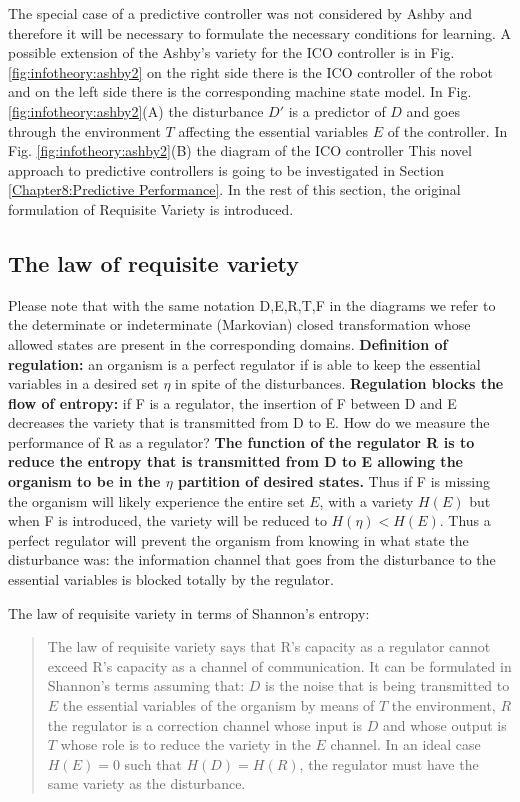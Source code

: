 The special case of a predictive controller was not considered by Ashby and therefore
it will be necessary to formulate the necessary conditions for learning.
A possible extension of the Ashby's variety for the ICO controller is in Fig. \ref{fig:infotheory:ashby2}
on the right side there is the ICO controller of the robot and on the left side
there is the corresponding machine state model.
In Fig. \ref{fig:infotheory:ashby2}(A) the disturbance $D'$ is a predictor of $D$ and goes
through the environment $T$ affecting the essential variables $E$ of the controller.
In Fig. \ref{fig:infotheory:ashby2}(B) the diagram of the ICO controller 
This novel approach to predictive controllers is going to be investigated in Section \ref{Chapter8:Predictive Performance}.
In the rest of this section, the original formulation of Requisite Variety is 
introduced.

\subsection{The law of requisite variety}
Please note that with the same notation D,E,R,T,F in the diagrams we refer to
 the determinate or indeterminate (Markovian) closed transformation whose
allowed states are present in the corresponding domains.
\textbf{Definition of regulation:} an organism is a perfect regulator if
is able to keep the essential variables in a desired set $\eta$ in spite
of the disturbances.
\textbf{Regulation blocks the flow of entropy: } if F is a regulator, the insertion
of F between D and E decreases the variety that is transmitted from D to E.
How do we measure the performance of R as a regulator?
\textbf{The function of the regulator R is to reduce the entropy that is transmitted
 from D to E allowing the organism to be in the $\eta$ partition of desired states.}
Thus if F is missing the organism will likely experience the entire set $E$, with
a variety $H(E)$ but when F is introduced, the variety will be reduced to $H(\eta)<H(E)$.
Thus a perfect regulator will prevent the organism from knowing in what state the
disturbance was: the information channel that goes from the disturbance to the
essential variables is blocked totally by the regulator.

The law of requisite variety in terms of Shannon's entropy:
\begin{quotation}
The law of requisite variety says that R's capacity as a regulator cannot
exceed R's capacity as a channel of communication.
It can be formulated in Shannon's terms assuming that: $D$ is the noise that is
 being transmitted to $E$ the essential variables of the organism by means of $T$
the environment, $R$ the regulator is a correction channel whose input is $D$ and
whose output is $T$ whose role is to reduce the variety in the $E$ channel.
In an ideal case $H(E)=0$ such that $H(D)=H(R)$, the regulator must have
the same variety as the disturbance. 
\end{quotation}

